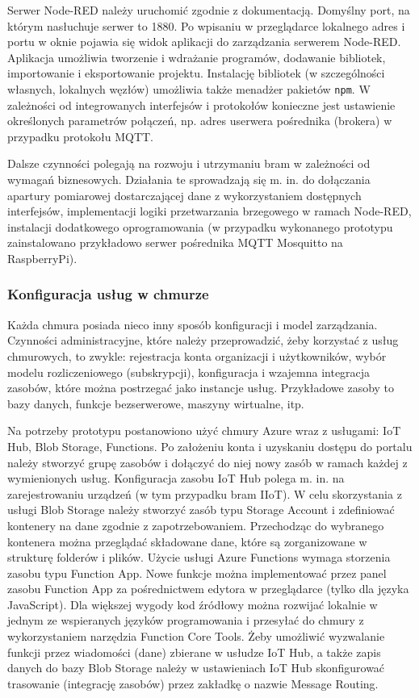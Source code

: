\documentclass[a4paper, 12pt, twoside]{article}
\begin{document}
Serwer Node-RED należy uruchomić zgodnie z dokumentacją. Domyślny port, na 
którym nasłuchuje serwer to 1880. Po wpisaniu w przeglądarce lokalnego adres i portu
w oknie pojawia się widok aplikacji do zarządzania serwerem Node-RED. Aplikacja
umożliwia tworzenie i wdrażanie programów, dodawanie bibliotek, importowanie i eksportowanie projektu.
Instalację bibliotek (w szczególności własnych, lokalnych węzłów) umożliwia także menadżer pakietów \texttt{npm}.
W zależności od integrowanych interfejsów i protokołów konieczne jest ustawienie
określonych parametrów połączeń, np. adres userwera pośrednika (brokera) w przypadku protokołu MQTT.

Dalsze czynności polegają na rozwoju i utrzymaniu bram w zależności od wymagań
biznesowych. Działania te sprowadzają się m. in. do dołączania apartury pomiarowej dostarczającej dane
z wykorzystaniem dostępnych interfejsów, implementacji logiki przetwarzania
brzegowego w ramach Node-RED, instalacji dodatkowego oprogramowania 
(w przypadku wykonanego prototypu zainstalowano przykładowo serwer pośrednika MQTT Mosquitto na RaspberryPi).


\subsubsection{Konfiguracja usług w chmurze}

Każda chmura posiada nieco inny sposób konfiguracji i model zarządzania. 
Czynności administracyjne, które należy przeprowadzić, żeby korzystać z usług
chmurowych, to zwykle: rejestracja konta organizacji i użytkowników,
wybór modelu rozliczeniowego (subskrypcji), konfiguracja i wzajemna
integracja zasobów, które można postrzegać jako instancje usług. Przykładowe zasoby
to bazy danych, funkcje bezserwerowe, maszyny wirtualne, itp. 

Na potrzeby prototypu postanowiono użyć chmury Azure wraz z usługami:
IoT Hub, Blob Storage, Functions. Po założeniu konta i uzyskaniu 
dostępu do portalu należy stworzyć grupę zasobów i dołączyć do niej nowy zasób 
w ramach każdej z wymienionych usług.
Konfiguracja zasobu IoT Hub polega m. in. na zarejestrowaniu urządzeń (w tym przypadku bram IIoT).
W celu skorzystania z usługi Blob Storage należy stworzyć zasób typu
Storage Account i zdefiniować kontenery na dane zgodnie z zapotrzebowaniem.
Przechodząc do wybranego kontenera można przeglądać składowane dane, które
są zorganizowane w strukturę folderów i plików.
Użycie usługi Azure Functions wymaga storzenia zasobu typu Function App. 
Nowe funkcje można implementować przez panel zasobu Function App za pośrednictwem
edytora w przeglądarce (tylko dla języka JavaScript). Dla większej wygody
kod źródłowy można rozwijać lokalnie w jednym ze wspieranych języków programowania
i przesyłać do chmury z wykorzystaniem narzędzia Function Core Tools.
Żeby umożliwić wyzwalanie funkcji przez wiadomości (dane) zbierane w usłudze IoT Hub,
a także zapis danych do bazy Blob Storage należy w ustawieniach IoT Hub
skonfigurować trasowanie (integrację zasobów) przez zakładkę o nazwie Message Routing.
\end{document}
